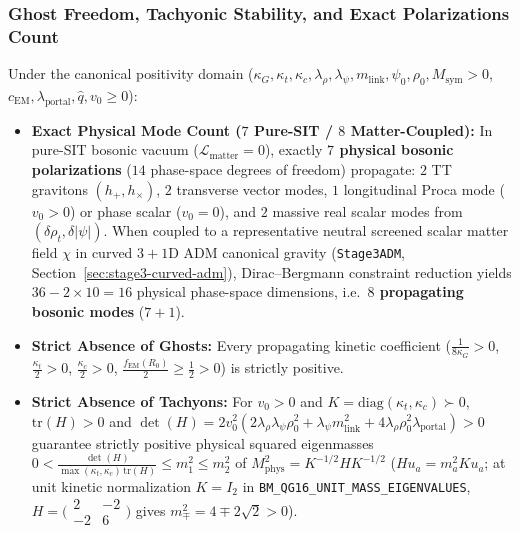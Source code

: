 \subsubsection{Ghost Freedom, Tachyonic Stability, and Exact Polarizations Count}

Under the canonical positivity domain ($\kappa_G, \kappa_t, \kappa_c, \lambda_\rho, \lambda_\psi, m_{\mathrm{link}}, \psi_0, \rho_0, M_{\mathrm{sym}} > 0$, $c_{\mathrm{EM}}, \lambda_{\mathrm{portal}}, \hat{q}, v_0 \ge 0$):
\begin{itemize}
  \item \textbf{Exact Physical Mode Count ($7$ Pure-SIT / $8$ Matter-Coupled):} In pure-SIT bosonic vacuum ($\mathcal{L}_{\mathrm{matter}} = 0$), exactly \textbf{$7$ physical bosonic polarizations} ($14$ phase-space degrees of freedom) propagate: $2$ TT gravitons $(h_+, h_\times)$, $2$ transverse vector modes, $1$ longitudinal Proca mode ($v_0 > 0$) or phase scalar ($v_0 = 0$), and $2$ massive real scalar modes from $(\delta\rho_t, \delta|\psi|)$. When coupled to a representative neutral screened scalar matter field $\chi$ in curved $3+1$D ADM canonical gravity (\texttt{Stage3ADM}, Section~\ref{sec:stage3-curved-adm}), Dirac--Bergmann constraint reduction yields $36 - 2\times 10 = 16$ physical phase-space dimensions, i.e.\ \textbf{$8$ propagating bosonic modes} ($7 + 1$).
  \item \textbf{Strict Absence of Ghosts:} Every propagating kinetic coefficient ($\frac{1}{8\kappa_G} > 0$, $\frac{\kappa_t}{2} > 0$, $\frac{\kappa_c}{2} > 0$, $\frac{f_{\mathrm{EM}}(R_0)}{2} \ge \frac{1}{2} > 0$) is strictly positive.
  \item \textbf{Strict Absence of Tachyons:} For $v_0 > 0$ and $K = \mathrm{diag}(\kappa_t, \kappa_c) \succ 0$, $\mathrm{tr}(H) > 0$ and $\det(H) = 2v_0^2(2\lambda_\rho\lambda_\psi\rho_0^2 + \lambda_\psi m_{\mathrm{link}}^2 + 4\lambda_\rho\rho_0^2\lambda_{\mathrm{portal}}) > 0$ guarantee strictly positive physical squared eigenmasses $0 < \frac{\det(H)}{\max(\kappa_t,\kappa_c)\,\mathrm{tr}(H)} \le m_1^2 \le m_2^2$ of $M_{\mathrm{phys}}^2 = K^{-1/2} H K^{-1/2}$ ($H u_a = m_a^2 K u_a$; at unit kinetic normalization $K = I_2$ in \texttt{BM\_\allowbreak{}QG16\_\allowbreak{}UNIT\_\allowbreak{}MASS\_\allowbreak{}EIGENVALUES}, $H = \bigl(\begin{smallmatrix}2 & -2\\ -2 & 6\end{smallmatrix}\bigr)$ gives $m_\mp^2 = 4 \mp 2\sqrt{2} > 0$).
\end{itemize}

